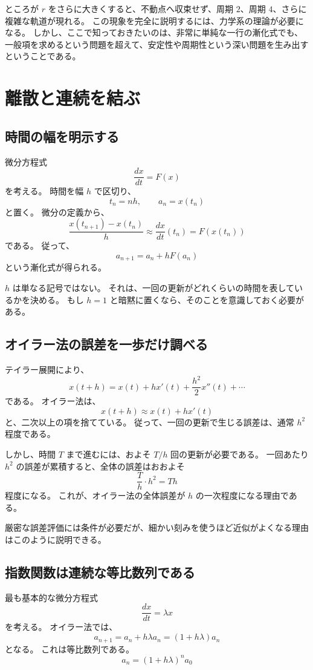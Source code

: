 ところが $r$ をさらに大きくすると、不動点へ収束せず、周期 $2$、周期 $4$、さらに複雑な軌道が現れる。
この現象を完全に説明するには、力学系の理論が必要になる。
しかし、ここで知っておきたいのは、非常に単純な一行の漸化式でも、一般項を求めるという問題を超えて、安定性や周期性という深い問題を生み出すということである。

\section{離散と連続を結ぶ}

\subsection{時間の幅を明示する}

微分方程式
\[
  \frac{dx}{dt}=F(x)
\]
を考える。
時間を幅 $h$ で区切り、
\[
  t_n=nh,\qquad a_n=x(t_n)
\]
と置く。
微分の定義から、
\[
  \frac{x(t_{n+1})-x(t_n)}h
  \approx \frac{dx}{dt}(t_n)
  =F(x(t_n))
\]
である。
従って、
\[
  a_{n+1}=a_n+hF(a_n)
\]
という漸化式が得られる。

$h$ は単なる記号ではない。
それは、一回の更新がどれくらいの時間を表しているかを決める。
もし $h=1$ と暗黙に置くなら、そのことを意識しておく必要がある。

\subsection{オイラー法の誤差を一歩だけ調べる}

テイラー展開により、
\[
  x(t+h)
  =x(t)+hx'(t)+\frac{h^2}{2}x''(t)+\cdots
\]
である。
オイラー法は、
\[
  x(t+h)\approx x(t)+hx'(t)
\]
と、二次以上の項を捨てている。
従って、一回の更新で生じる誤差は、通常 $h^2$ 程度である。

しかし、時間 $T$ まで進むには、およそ $T/h$ 回の更新が必要である。
一回あたり $h^2$ の誤差が累積すると、全体の誤差はおおよそ
\[
  \frac{T}{h}\cdot h^2=Th
\]
程度になる。
これが、オイラー法の全体誤差が $h$ の一次程度になる理由である。

厳密な誤差評価には条件が必要だが、細かい刻みを使うほど近似がよくなる理由はこのように説明できる。

\subsection{指数関数は連続な等比数列である}

最も基本的な微分方程式
\[
  \frac{dx}{dt}=\lambda x
\]
を考える。
オイラー法では、
\[
  a_{n+1}=a_n+h\lambda a_n
  =(1+h\lambda)a_n
\]
となる。
これは等比数列である。
\[
  a_n=(1+h\lambda)^n a_0
\]


